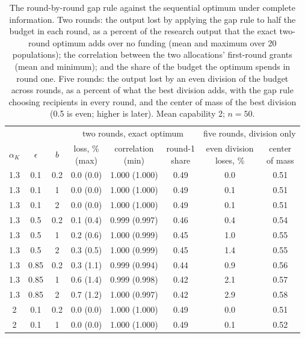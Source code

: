 \begin{table}[tp]
\centering
\footnotesize
\setlength{\tabcolsep}{3pt}
\caption{The round-by-round gap rule against the sequential optimum under complete information. Two rounds: the output lost by applying the gap rule to half the budget in each round, as a percent of the research output that the exact two-round optimum adds over no funding (mean and maximum over 20 populations); the correlation between the two allocations' first-round grants (mean and minimum); and the share of the budget the optimum spends in round one. Five rounds: the output lost by an even division of the budget across rounds, as a percent of what the best division adds, with the gap rule choosing recipients in every round, and the center of mass of the best division (0.5 is even; higher is later). Mean capability 2; $n = 50$.}
\label{tab:dynopt}
\begin{tabular}{@{}cccccccc@{}}
\toprule
& & & \multicolumn{3}{c}{two rounds, exact optimum} & \multicolumn{2}{c}{five rounds, division only} \\
$\alpha_K$ & $\epsilon$ & $b$ & \makecell{loss, \%\\(max)} & \makecell{correlation\\(min)} & \makecell{round-1\\share} & \makecell{even division\\loses, \%} & \makecell{center\\of mass} \\
\midrule
1.3 & 0.1 & 0.2 & 0.0 (0.0) & 1.000 (1.000) & 0.49 & 0.0 & 0.51 \\
1.3 & 0.1 & 1 & 0.0 (0.0) & 1.000 (1.000) & 0.49 & 0.1 & 0.51 \\
1.3 & 0.1 & 2 & 0.0 (0.0) & 1.000 (1.000) & 0.49 & 0.1 & 0.51 \\
1.3 & 0.5 & 0.2 & 0.1 (0.4) & 0.999 (0.997) & 0.46 & 0.4 & 0.54 \\
1.3 & 0.5 & 1 & 0.2 (0.6) & 1.000 (0.999) & 0.45 & 1.0 & 0.55 \\
1.3 & 0.5 & 2 & 0.3 (0.5) & 1.000 (0.999) & 0.45 & 1.4 & 0.55 \\
1.3 & 0.85 & 0.2 & 0.3 (1.1) & 0.999 (0.994) & 0.44 & 0.9 & 0.56 \\
1.3 & 0.85 & 1 & 0.6 (1.4) & 0.999 (0.998) & 0.42 & 2.1 & 0.57 \\
1.3 & 0.85 & 2 & 0.7 (1.2) & 1.000 (0.997) & 0.42 & 2.9 & 0.58 \\
2 & 0.1 & 0.2 & 0.0 (0.0) & 1.000 (1.000) & 0.49 & 0.0 & 0.51 \\
2 & 0.1 & 1 & 0.0 (0.0) & 1.000 (1.000) & 0.49 & 0.1 & 0.52 \\

\end{tabular}
\end{table}

